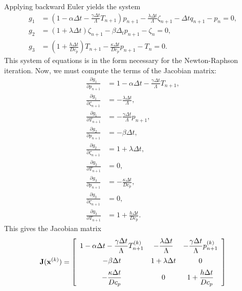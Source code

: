 Applying backward Euler yields the system
\begin{subequations}
\begin{align}
  g_1 &= \left( 1 - \alpha \Delta t - \frac{ \gamma \Delta t }{ \Lambda } T_{n+1} \right) p_{n+1} - \frac{\lambda \Delta t}{\Lambda} \zeta_{n+1} - \Delta t q_{n+1} - p_n = 0, \\
  g_2 &= ( 1 + \lambda \Delta t ) \zeta_{n+1} - \beta \Delta_t p_{n+1} - \zeta_n = 0, \\
  g_3 &= \left( 1 + \frac{h \Delta t}{ D c_p } \right) T_{n+1} - \frac{\kappa \Delta t}{D c_p } p_{n+1} - T_n = 0.
\end{align}
\end{subequations}
This system of equations is in the form necessary for the Newton-Raphson iteration. Now, we must compute the terms of the Jacobian matrix:
\begin{subequations}
\begin{align}
  \frac{\partial g_1}{\partial p_{n+1}}     &= 1 - \alpha \Delta t - \frac{ \gamma \Delta t }{ \Lambda } T_{n+1}, \\
  \frac{\partial g_1}{\partial \zeta_{n+1}} &= - \frac{\lambda \Delta t}{\Lambda}, \\
  \frac{\partial g_1}{\partial T_{n+1}}     &= - \frac{ \gamma \Delta t }{ \Lambda } p_{n+1}, \\
  \frac{\partial g_2}{\partial p_{n+1}}     &= - \beta \Delta t, \\
  \frac{\partial g_2}{\partial \zeta_{n+1}} &= 1 + \lambda \Delta t , \\
  \frac{\partial g_2}{\partial T_{n+1}}     &= 0, \\
  \frac{\partial g_3}{\partial p_{n+1}}     &=  - \frac{\kappa \Delta t}{D c_p }, \\
  \frac{\partial g_3}{\partial \zeta_{n+1}} &= 0 , \\
  \frac{\partial g_3}{\partial T_{n+1}}     &= 1 + \frac{h \Delta t}{ D c_p } .  
\end{align}
\end{subequations}
This gives the Jacobian matrix
\begin{align}
  \mathbf{J}(\mathbf{x}^{(k)})  = \left[ \begin{array}{c c c}
   1 - \alpha \Delta t - \dfrac{ \gamma \Delta t }{ \Lambda } T_{n+1}^{(k)} & - \dfrac{\lambda \Delta t}{\Lambda} & - \dfrac{ \gamma \Delta t }{ \Lambda } p_{n+1}^{(k)} \vspace{0.2cm}  \\
   - \beta \Delta t & 1 + \lambda \Delta t  & 0 \vspace{0.2cm}  \\
    - \dfrac{\kappa \Delta t}{D c_p } & 0 & 1 + \dfrac{h \Delta t}{ D c_p }  \end{array} \right]
\end{align}
